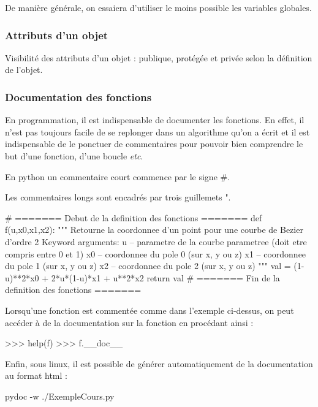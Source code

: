 \documentclass[11pt,oneside]{article}
\begin{document}
\begin{rem}
De manière générale, on essaiera d'utiliser le moins possible les variables globales.
\end{rem}

\subsubsection{Attributs d'un objet}

Visibilité des attributs d'un objet : publique, protégée et privée selon la définition de l'objet.

\subsubsection{Documentation des fonctions}
En programmation, il est indispensable de documenter les fonctions. En effet, il n'est pas toujours facile de se replonger dans un algorithme qu'on a écrit et il est indispensable de le ponctuer de commentaires pour pouvoir bien comprendre le but d'une fonction, d'une boucle \textit{etc}.

\begin{py}
En python un commentaire court commence par le signe \#. 

Les commentaires longs sont encadrés par trois guillemets ".

\begin{python}
# ======= Debut de la definition des fonctions =======
def f(u,x0,x1,x2):
    """
    Retourne la coordonnee d'un point pour une courbe de Bezier d'ordre 2
    Keyword arguments:
    u -- parametre de la courbe parametree (doit etre compris entre 0 et 1)
    x0 -- coordonnee du pole 0 (sur x, y ou z)
    x1 -- coordonnee du pole 1 (sur x, y ou z)
    x2 -- coordonnee du pole 2 (sur x, y ou z)
    """
    val = (1-u)**2*x0 + 2*u*(1-u)*x1 + u**2*x2
    return val
# ======= Fin de la definition des fonctions =======
\end{python}

Lorsqu'une fonction est commentée comme dans l'exemple ci-dessus, on peut accéder à de la documentation sur la fonction en procédant ainsi :
\begin{python}
>>> help(f)
>>> f.__doc__
\end{python}

Enfin, sous linux, il est possible de générer automatiquement de la documentation au format \textsf{html} :

\textsf{pydoc -w ./ExempleCours.py} 
\end{py}
\end{document}
